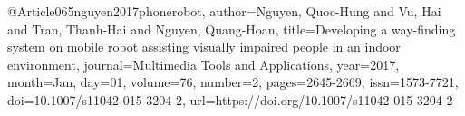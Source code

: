 @Article{065nguyen2017phonerobot,
author={Nguyen, Quoc-Hung
and Vu, Hai
and Tran, Thanh-Hai
and Nguyen, Quang-Hoan},
title={Developing a way-finding system on mobile robot assisting visually impaired people in an indoor environment},
journal={Multimedia Tools and Applications},
year={2017},
month={Jan},
day={01},
volume={76},
number={2},
pages={2645-2669},
issn={1573-7721},
doi={10.1007/s11042-015-3204-2},
url={https://doi.org/10.1007/s11042-015-3204-2}
}